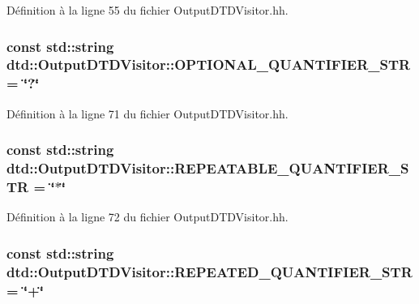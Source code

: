 Définition à la ligne 55 du fichier OutputDTDVisitor.hh.

\hypertarget{classdtd_1_1_output_d_t_d_visitor_a98f9105b5bccb426bc8a6e907a67b17f}{
\subsubsection[{OPTIONAL\_\-QUANTIFIER\_\-STR}]{\setlength{\rightskip}{0pt plus 5cm}const std::string {\bf dtd::OutputDTDVisitor::OPTIONAL\_\-QUANTIFIER\_\-STR} = \char`\"{}?\char`\"{}}}
\label{classdtd_1_1_output_d_t_d_visitor_a98f9105b5bccb426bc8a6e907a67b17f}


Définition à la ligne 71 du fichier OutputDTDVisitor.hh.

\hypertarget{classdtd_1_1_output_d_t_d_visitor_a4041af52751607ff7ae188484d962d95}{
\subsubsection[{REPEATABLE\_\-QUANTIFIER\_\-STR}]{\setlength{\rightskip}{0pt plus 5cm}const std::string {\bf dtd::OutputDTDVisitor::REPEATABLE\_\-QUANTIFIER\_\-STR} = \char`\"{}$\ast$\char`\"{}}}
\label{classdtd_1_1_output_d_t_d_visitor_a4041af52751607ff7ae188484d962d95}


Définition à la ligne 72 du fichier OutputDTDVisitor.hh.

\hypertarget{classdtd_1_1_output_d_t_d_visitor_ae8c6ec6c1f6ae17d8705be7267b07a2f}{
\subsubsection[{REPEATED\_\-QUANTIFIER\_\-STR}]{\setlength{\rightskip}{0pt plus 5cm}const std::string {\bf dtd::OutputDTDVisitor::REPEATED\_\-QUANTIFIER\_\-STR} = \char`\"{}+\char`\"{}}}
\label{classdtd_1_1_output_d_t_d_visitor_ae8c6ec6c1f6ae17d8705be7267b07a2f}


